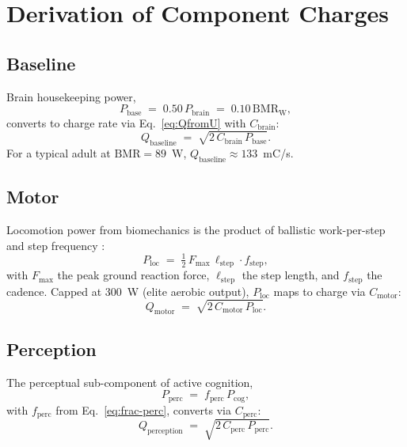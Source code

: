 \documentclass[11pt,twocolumn,a4paper]{article}
\theoremstyle{definition}
\theoremstyle{remark}
\newcommand{\Qmo}{Q_{\mathrm{motor}}}
\newcommand{\Qpe}{Q_{\mathrm{perception}}}
\newcommand{\Qba}{Q_{\mathrm{baseline}}}
\newcommand{\Pbrain}{P_{\mathrm{brain}}}
\newcommand{\Pbase}{P_{\mathrm{base}}}
\newcommand{\Pcog}{P_{\mathrm{cog}}}
\newcommand{\Pperc}{P_{\mathrm{perc}}}
\newcommand{\Ploc}{P_{\mathrm{loc}}}
\newcommand{\Cbrain}{C_{\mathrm{brain}}}
\newcommand{\Cmotor}{C_{\mathrm{motor}}}
\newcommand{\Cperc}{C_{\mathrm{perc}}}
\begin{document}
\section{Derivation of Component Charges}
\label{sec:derivation}

\subsection{Baseline}

Brain housekeeping power,
\begin{equation}
\Pbase \;=\; 0.50\,\Pbrain \;=\; 0.10\,\mathrm{BMR}_{\mathrm{W}},
\end{equation}
converts to charge rate via Eq.~\eqref{eq:QfromU} with $\Cbrain$:
\begin{equation}
\Qba \;=\; \sqrt{2\,\Cbrain\,\Pbase}.
\end{equation}
For a typical adult at $\mathrm{BMR}=89$~W, $\Qba\approx 133$~mC/s.

\subsection{Motor}

Locomotion power from biomechanics is the product of ballistic
work-per-step and step frequency
\citep{cavagna1977,kram1990}:
\begin{equation}
\Ploc \;=\; \tfrac{1}{2}\,F_{\max}\,\ell_{\mathrm{step}}\cdot f_{\mathrm{step}},
\end{equation}
with $F_{\max}$ the peak ground reaction force, $\ell_{\mathrm{step}}$
the step length, and $f_{\mathrm{step}}$ the cadence.
Capped at 300~W (elite aerobic output), $\Ploc$ maps to charge via
$\Cmotor$:
\begin{equation}
\Qmo \;=\; \sqrt{2\,\Cmotor\,\Ploc}.
\end{equation}

\subsection{Perception}

The perceptual sub-component of active cognition,
\begin{equation}
\Pperc \;=\; f_{\mathrm{perc}}\,\Pcog,
\end{equation}
with $f_{\mathrm{perc}}$ from Eq.~\eqref{eq:frac-perc}, converts via
$\Cperc$:
\begin{equation}
\Qpe \;=\; \sqrt{2\,\Cperc\,\Pperc}.
\end{equation}
\end{document}

